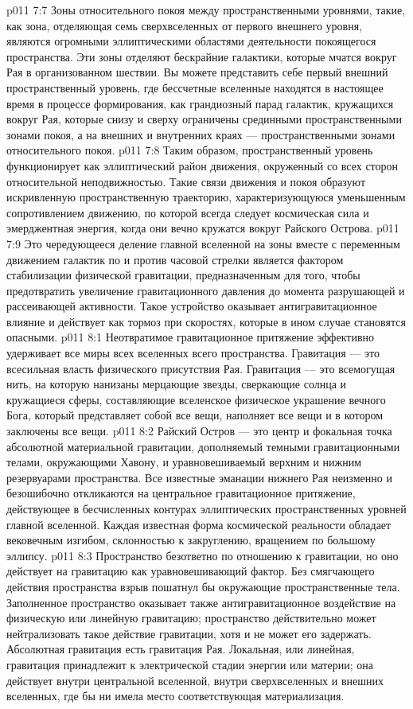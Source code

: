 \vs p011 7:7 \pc Зоны относительного покоя между пространственными уровнями, такие, как зона, отделяющая семь сверхвселенных от первого внешнего уровня, являются огромными эллиптическими областями деятельности покоящегося пространства. Эти зоны отделяют бескрайние галактики, которые мчатся вокруг Рая в организованном шествии. Вы можете представить себе первый внешний пространственный уровень, где бессчетные вселенные находятся в настоящее время в процессе формирования, как грандиозный парад галактик, кружащихся вокруг Рая, которые снизу и сверху ограничены срединными пространственными зонами покоя, а на внешних и внутренних краях --- пространственными зонами относительного покоя.
\vs p011 7:8 Таким образом, пространственный уровень функционирует как эллиптический район движения, окруженный со всех сторон относительной неподвижностью. Такие связи движения и покоя образуют искривленную пространственную траекторию, характеризующуюся уменьшенным сопротивлением движению, по которой всегда следует космическая сила и эмерджентная энергия, когда они вечно кружатся вокруг Райского Острова.
\vs p011 7:9 Это чередующееся деление главной вселенной на зоны вместе с переменным движением галактик по и против часовой стрелки является фактором стабилизации физической гравитации, предназначенным для того, чтобы предотвратить увеличение гравитационного давления до момента разрушающей и рассеивающей активности. Такое устройство оказывает антигравитационное влияние и действует как тормоз при скоростях, которые в ином случае становятся опасными.
\vs p011 8:1 Неотвратимое гравитационное притяжение эффективно удерживает все миры всех вселенных всего пространства. Гравитация --- это всесильная власть физического присутствия Рая. Гравитация --- это всемогущая нить, на которую нанизаны мерцающие звезды, сверкающие солнца и кружащиеся сферы, составляющие вселенское физическое украшение вечного Бога, который представляет собой все вещи, наполняет все вещи и в котором заключены все вещи.
\vs p011 8:2 Райский Остров --- это центр и фокальная точка абсолютной материальной гравитации, дополняемый темными гравитационными телами, окружающими Хавону, и уравновешиваемый верхним и нижним резервуарами пространства. Все известные эманации нижнего Рая неизменно и безошибочно откликаются на центральное гравитационное притяжение, действующее в бесчисленных контурах эллиптических пространственных уровней главной вселенной. Каждая известная форма космической реальности обладает вековечным изгибом, склонностью к закруглению, вращением по большому эллипсу.
\vs p011 8:3 Пространство безответно по отношению к гравитации, но оно действует на гравитацию как уравновешивающий фактор. Без смягчающего действия пространства взрыв пошатнул бы окружающие пространственные тела. Заполненное пространство оказывает также антигравитационное воздействие на физическую или линейную гравитацию; пространство действительно может нейтрализовать такое действие гравитации, хотя и не может его задержать. Абсолютная гравитация есть гравитация Рая. Локальная, или линейная, гравитация принадлежит к электрической стадии энергии или материи; она действует внутри центральной вселенной, внутри сверхвселенных и внешних вселенных, где бы ни имела место соответствующая материализация.
